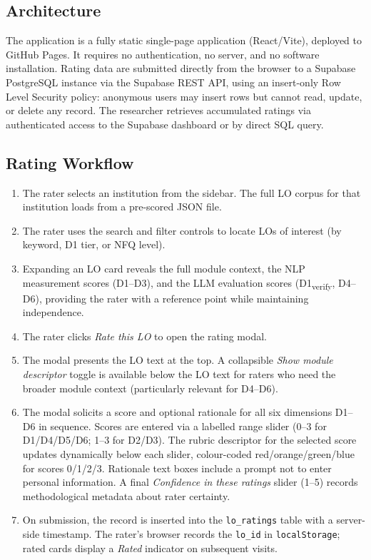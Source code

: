 \documentclass[12pt, a4paper]{article}
\begin{document}
\subsection{Architecture}

The application is a fully static single-page application (React/Vite), deployed
to GitHub Pages. It requires no authentication, no server, and no software
installation. Rating data are submitted directly from the browser to a Supabase
PostgreSQL instance via the Supabase REST API, using an insert-only Row Level
Security policy: anonymous users may insert rows but cannot read, update, or delete
any record. The researcher retrieves accumulated ratings via authenticated access to
the Supabase dashboard or by direct SQL query.

\subsection{Rating Workflow}

\begin{enumerate}
  \item The rater selects an institution from the sidebar. The full LO corpus for
  that institution loads from a pre-scored JSON file.
  \item The rater uses the search and filter controls to locate LOs of interest
  (by keyword, D1 tier, or NFQ level).
  \item Expanding an LO card reveals the full module context, the NLP measurement
  scores (D1--D3), and the LLM evaluation scores (D1\textsubscript{verify}, D4--D6),
  providing the rater with a reference point while maintaining independence.
  \item The rater clicks \textit{Rate this LO} to open the rating modal.
  \item The modal presents the LO text at the top. A collapsible \textit{Show
  module descriptor} toggle is available below the LO text for raters who need
  the broader module context (particularly relevant for D4--D6).
  \item The modal solicits a score and optional rationale for all six dimensions
  D1--D6 in sequence. Scores are entered via a labelled range slider (0--3 for
  D1/D4/D5/D6; 1--3 for D2/D3). The rubric descriptor for the selected score
  updates dynamically below each slider, colour-coded red/orange/green/blue for
  scores 0/1/2/3. Rationale text boxes include a prompt not to enter personal
  information. A final \textit{Confidence in these ratings} slider (1--5) records
  methodological metadata about rater certainty.
  \item On submission, the record is inserted into the \texttt{lo\_ratings} table
  with a server-side timestamp. The rater's browser records the \texttt{lo\_id} in
  \texttt{localStorage}; rated cards display a \textit{Rated} indicator on
  subsequent visits.
\end{enumerate}
\end{document}
